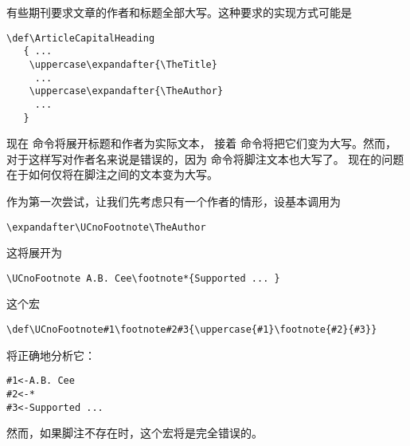 \documentclass{book}
\begin{document}
有些期刊要求文章的作者和标题全部大写。这种要求的实现方式可能是
\begin{verbatim}
\def\ArticleCapitalHeading
   { ...
    \uppercase\expandafter{\TheTitle}
     ...
    \uppercase\expandafter{\TheAuthor}
     ...
   }
\end{verbatim}
现在  命令将展开标题和作者为实际文本，
接着  命令将把它们变为大写。然而，
对于这样写对作者名来说是错误的，因为  命令将脚注文本也大写了。
现在的问题在于如何仅将在脚注之间的文本变为大写。

作为第一次尝试，让我们先考虑只有一个作者的情形，设基本调用为
\begin{verbatim}
\expandafter\UCnoFootnote\TheAuthor
\end{verbatim}
这将展开为
\begin{verbatim}
\UCnoFootnote A.B. Cee\footnote*{Supported ... }
\end{verbatim}
这个宏
\begin{verbatim}
\def\UCnoFootnote#1\footnote#2#3{\uppercase{#1}\footnote{#2}{#3}}
\end{verbatim}
将正确地分析它：
\begin{verbatim}
#1<-A.B. Cee
#2<-*
#3<-Supported ...
\end{verbatim}
然而，如果脚注不存在时，这个宏将是完全错误的。
\end{document}
